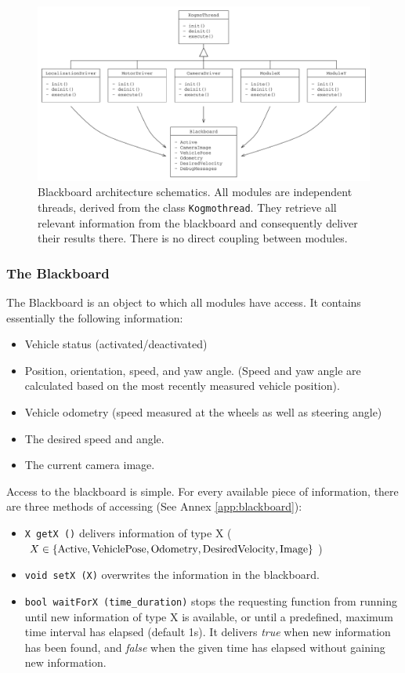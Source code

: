 \documentclass[a4paper, 11pt]{article}
\newcommand{\code}[1]{\texttt{#1}}
\begin{document}
{\begin{figure}
\includegraphics[width=\textwidth]{blackboardArchitecture}
\caption{Blackboard architecture schematics. All modules are independent threads, derived from the class \code{Kogmothread}. They retrieve all relevant information from the blackboard and consequently deliver their results there. There is no direct coupling between modules.}
\end{figure}

\subsubsection{The Blackboard}
The Blackboard is an object to which all modules have access. It contains essentially the following information:
\begin{itemize}
\item Vehicle status (activated/deactivated)
\item Position, orientation, speed, and yaw angle. (Speed and yaw angle are calculated based on the most recently measured vehicle position).
\item Vehicle odometry (speed measured at the wheels as well as steering angle)
\item The desired speed and angle.
\item The current camera image.
\end{itemize}

Access to the blackboard is simple. For every available piece of information, there are three methods of accessing (See Annex \ref{app:blackboard}):
\begin{itemize}
\item \code{X getX ()} delivers information of type X ($X\in \{ \text{Active}, \text{VehiclePose}, \text{Odometry},\linebreak \text{DesiredVelocity}, \text{Image} \}$)
\item \code{void setX (X)} overwrites the information in the blackboard.
\item \code{bool waitForX (time\_duration)} stops the requesting function from running until new information of type X is available, or until a predefined, maximum time interval has elapsed (default 1s). It delivers \textit{true} when new information has been found, and \textit{false} when the given time has elapsed without gaining new information.
\end {itemize}

}
\end{document}
